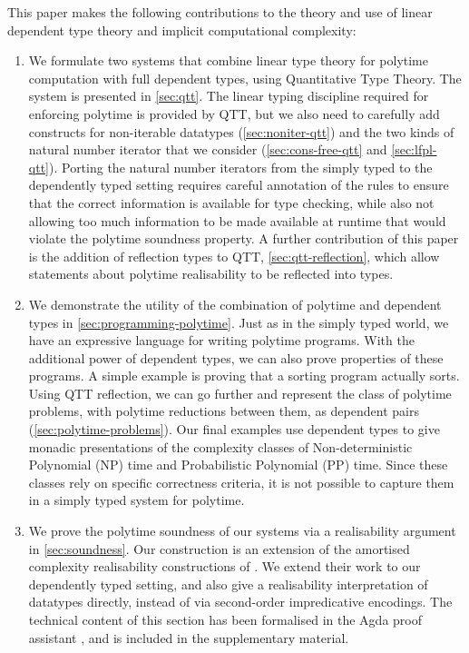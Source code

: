 \documentclass[acmsmall,screen]{acmart}
\begin{document}
This paper makes the following contributions to the theory and use of
linear dependent type theory and implicit computational complexity:
\begin{enumerate}
\item We formulate two systems that combine linear type theory for
  polytime computation with full dependent types, using Quantitative
  Type Theory. The system is presented in \autoref{sec:qtt}. The
  linear typing discipline required for enforcing polytime is provided
  by QTT, but we also need to carefully add constructs for
  non-iterable datatypes (\autoref{sec:noniter-qtt}) and the two kinds
  of natural number iterator that we consider
  (\autoref{sec:cons-free-qtt} and \autoref{sec:lfpl-qtt}). Porting
  the natural number iterators from the simply typed to the
  dependently typed setting requires careful annotation of the rules
  to ensure that the correct information is available for type
  checking, while also not allowing too much information to be made
  available at runtime that would violate the polytime soundness
  property. A further contribution of this paper is the addition of
  reflection types to QTT, \autoref{sec:qtt-reflection}, which allow
  statements about polytime realisability to be reflected into
  types. %
\item We demonstrate the utility of the combination of polytime and
  dependent types in \autoref{sec:programming-polytime}. Just as in
  the simply typed world, we have an expressive language for writing
  polytime programs. With the additional power of dependent types, we
  can also prove properties of these programs. A simple example is
  proving that a sorting program actually sorts. Using QTT reflection,
  we can go further and represent the class of polytime problems, with
  polytime reductions between them, as dependent pairs
  (\autoref{sec:polytime-problems}). Our final examples use dependent
  types to give monadic presentations of the complexity classes of
  Non-deterministic Polynomial (NP) time and Probabilistic Polynomial
  (PP) time. Since these classes rely on specific correctness
  criteria, it is not possible to capture them in a simply typed
  system for polytime.
\item We prove the polytime soundness of our systems via a
  realisability argument in \autoref{sec:soundness}. Our construction
  is an extension of the amortised complexity realisability
  constructions of \citet{dallago11realisability}. We extend their
  work to our dependently typed setting, and also give a realisability
  interpretation of datatypes directly, instead of via second-order
  impredicative encodings. The technical content of this section has
  been formalised in the Agda proof assistant
  \cite{norell2008dependently}, and is included in the supplementary
  material.
\end{enumerate}
\end{document}
